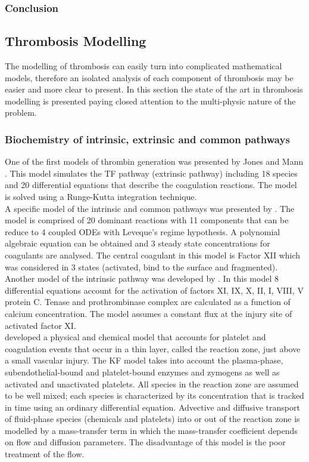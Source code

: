 \documentclass[%
 nofootinbib,
 amsmath,amssymb,
 aps,
 pra,
]{revtex4-1}
\begin{document}
\subsubsection{Conclusion}
\subsection{\label{sec:mechanical}Thrombosis Modelling}
The modelling of thrombosis can easily turn into complicated mathematical models, therefore an isolated analysis of each component of thrombosis may be easier and more clear to present. In this section the state of the art in thrombosis modelling is presented paying closed attention to the multi-physic nature of the problem.
\subsubsection{Biochemistry of intrinsic, extrinsic and common pathways}
One of the first models of thrombin generation was presented by Jones and Mann \citep{Jones:1994}. This model simulates the TF pathway (extrinsic pathway) including 18 species and 20 differential equations that describe the coagulation reactions. The model is solved using a Runge-Kutta integration technique.\\
A specific model of the intrinsic and common pathways was presented by \citet{Gregory:1994}. The model is comprised of 20 dominant reactions with 11 components that can be reduce to 4 coupled ODEs with Leveque's regime hypothesis. A polynomial algebraic equation can be obtained and 3 steady state concentrations for coagulants are analysed. The central coagulant in this model is Factor XII which was considered in 3 states (activated, bind to the surface and fragmented).\\
Another model of the intrinsic pathway was developed by \citet{Zarnitsina:1996}. In  this model 8 differential equations account for the activation of factors XI, IX, X, II, I, VIII, V protein C. Tenase and prothrombinase complex are calculated as a function of calcium concentration. The model assumes a constant flux at the injury site of activated factor XI.\\ 
\citet{Kuharsky:2001} developed a physical and chemical model that accounts for  platelet and coagulation events that occur in a thin layer, called the reaction zone, just above a small vascular injury. The KF model takes into account the plasma-phase, subendothelial-bound and platelet-bound enzymes and zymogens as well as activated and unactivated platelets. All species in the reaction zone are assumed to be well mixed; each species is characterized by its concentration that is tracked in time using an ordinary differential equation. Advective and diffusive transport of fluid-phase species (chemicals and platelets) into or out of the reaction zone is modelled by a mass-transfer term in which the mass-transfer coefficient depends on flow and diffusion parameters. The disadvantage of this model is the poor treatment of the flow.\\
\end{document}

